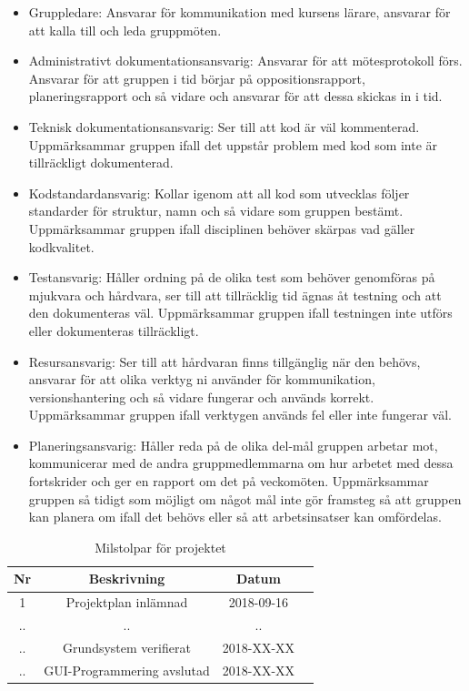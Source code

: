 \documentclass[a4paper]{article}
\begin{document}
\begin {itemize}

\item Gruppledare: Ansvarar för kommunikation med kursens lärare, ansvarar
    för att kalla till och leda gruppmöten.

\item Administrativt dokumentationsansvarig: Ansvarar för att
    mötesprotokoll förs. Ansvarar för att gruppen i tid börjar på
    oppositionsrapport, planeringsrapport och så vidare och ansvarar för
    att dessa skickas in i tid.

\item Teknisk dokumentationsansvarig: Ser till att kod är väl kommenterad.
    Uppmärksammar gruppen ifall det uppstår problem med kod som inte är
    tillräckligt dokumenterad.

\item Kodstandardansvarig: Kollar igenom att all kod som utvecklas följer
    standarder för struktur, namn och så vidare som gruppen bestämt.
    Uppmärksammar gruppen ifall disciplinen behöver skärpas vad
    gäller kodkvalitet.

\item Testansvarig: Håller ordning på de olika test som behöver genomföras
    på mjukvara och hårdvara, ser till att tillräcklig tid ägnas åt
    testning och att den dokumenteras väl. Uppmärksammar gruppen ifall
    testningen inte utförs eller dokumenteras tillräckligt.

\item Resursansvarig: Ser till att hårdvaran finns tillgänglig när den
    behövs, ansvarar för att olika verktyg ni använder för
    kommunikation, versionshantering och så vidare fungerar och
    används korrekt. Uppmärksammar gruppen ifall verktygen används fel
    eller inte fungerar väl.

\item Planeringsansvarig: Håller reda på de olika del-mål gruppen arbetar
    mot, kommunicerar med de andra gruppmedlemmarna om hur arbetet med
    dessa fortskrider och ger en rapport om det på veckomöten.
    Uppmärksammar gruppen så tidigt som möjligt om något mål inte gör
    framsteg så att gruppen kan planera om ifall det behövs eller så att
    arbetsinsatser kan omfördelas.

\end {itemize}

\begin {table} [h]
\begin {center}
\begin {tabular} {|c|c|c|c|}
    \hline
    Nr & Beskrivning & Datum \\
    \hline \hline
    1 & Projektplan inlämnad & 2018-09-16 \\
    \hline
    .. & .. &.. \\
    \hline
    .. & Grundsystem verifierat & 2018-XX-XX \\
    \hline
    .. & GUI-Programmering avslutad & 2018-XX-XX \\
    \hline
\end{tabular}
\caption {Milstolpar för projektet}
\end{center}
\end {table}
\end{document}
